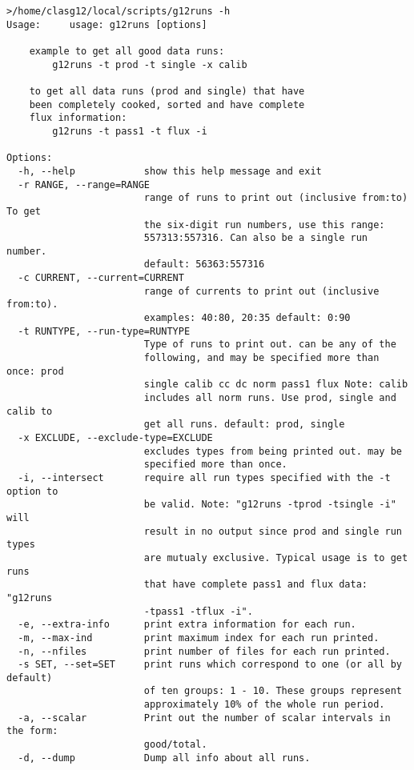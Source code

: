 \begin{verbatim}
>/home/clasg12/local/scripts/g12runs -h
Usage:     usage: g12runs [options]

    example to get all good data runs:
        g12runs -t prod -t single -x calib

    to get all data runs (prod and single) that have
    been completely cooked, sorted and have complete
    flux information:
        g12runs -t pass1 -t flux -i

Options:
  -h, --help            show this help message and exit
  -r RANGE, --range=RANGE
                        range of runs to print out (inclusive from:to) To get
                        the six-digit run numbers, use this range:
                        557313:557316. Can also be a single run number.
                        default: 56363:557316
  -c CURRENT, --current=CURRENT
                        range of currents to print out (inclusive from:to).
                        examples: 40:80, 20:35 default: 0:90
  -t RUNTYPE, --run-type=RUNTYPE
                        Type of runs to print out. can be any of the
                        following, and may be specified more than once: prod
                        single calib cc dc norm pass1 flux Note: calib
                        includes all norm runs. Use prod, single and calib to
                        get all runs. default: prod, single
  -x EXCLUDE, --exclude-type=EXCLUDE
                        excludes types from being printed out. may be
                        specified more than once.
  -i, --intersect       require all run types specified with the -t option to
                        be valid. Note: "g12runs -tprod -tsingle -i" will
                        result in no output since prod and single run types
                        are mutualy exclusive. Typical usage is to get runs
                        that have complete pass1 and flux data: "g12runs
                        -tpass1 -tflux -i".
  -e, --extra-info      print extra information for each run.
  -m, --max-ind         print maximum index for each run printed.
  -n, --nfiles          print number of files for each run printed.
  -s SET, --set=SET     print runs which correspond to one (or all by default)
                        of ten groups: 1 - 10. These groups represent
                        approximately 10% of the whole run period.
  -a, --scalar          Print out the number of scalar intervals in the form:
                        good/total.
  -d, --dump            Dump all info about all runs.
\end{verbatim}

